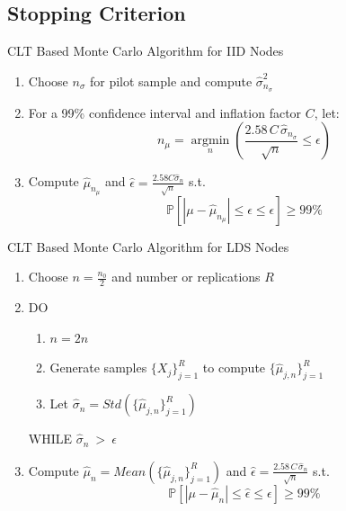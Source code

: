 \documentclass[11pt]{beamer}
\begin{document}
\subsection{Stopping Criterion}
\begin{frame}{CLT Based Monte Carlo Algorithm for IID Nodes}
    \begin{enumerate}
        \item Choose $n_{\sigma}$ for pilot sample and compute $ \hat{\sigma}_{n_{\sigma}}^2 $
        \item For a 99\% confidence interval and inflation factor $C$, let:
            $$ n_{\mu} = \operatorname*{argmin}_n (\frac{2.58\,C\,\hat{\sigma}_{n_{\sigma}}}{\sqrt{n}} \leq \epsilon) $$
        \item Compute $ \hat{\mu}_{n_{\mu}} $ and $\hat{\epsilon} = \frac{2.58 C \hat{\sigma}_n}{\sqrt{n}}$ s.t. 
            $$ \mathbb{P}[|\mu-\hat{\mu}_{n_{\mu}}| \leq \hat{\epsilon} \leq \epsilon] \geq 99\% $$
    \end{enumerate}
\end{frame}
\begin{frame}{CLT Based Monte Carlo Algorithm for LDS Nodes}
    \begin{enumerate}
        \item Choose $n=\frac{n_0}{2}$ and number or replications $R$
        \item DO
        \begin{enumerate}
            \item $n=2n$
            \item Generate samples $\{X_j\}_{j=1}^{R}$ to compute $\{\hat{\mu}_{j,n}\}_{j=1}^{R}$ 
            \item Let $ \hat{\sigma}_n = Std(\{\hat{\mu}_{j,n}\}_{j=1}^{R})$ 
        \end{enumerate}
        WHILE $ \hat{\sigma}_n \: > \: \epsilon $
        \item Compute $\hat{\mu}_n = Mean(\{\hat{\mu}_{j,n}\}_{j=1}^{R})$ and $\hat{\epsilon} = \frac{2.58\,C\,\hat{\sigma}_n}{\sqrt{n}}$ s.t. 
            $$ \mathbb{P}[|\mu-\hat{\mu}_{n}| \leq \hat{\epsilon} \leq \epsilon] \geq 99\% $$
    \end{enumerate}
\end{frame}

\end{document}
